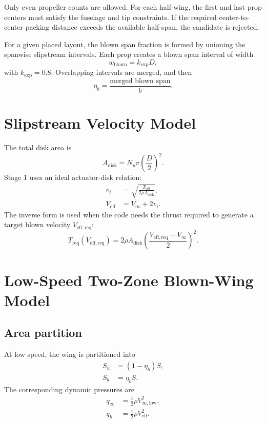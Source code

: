 \documentclass[11pt]{article}
\begin{document}
Only even propeller counts are allowed. For each half-wing, the first and last prop centers must satisfy the fuselage and tip constraints. If the required center-to-center packing distance exceeds the available half-span, the candidate is rejected.

For a given placed layout, the blown span fraction is formed by unioning the spanwise slipstream intervals. Each prop creates a blown span interval of width
\begin{equation}
w_{\mathrm{blown}} = k_{\mathrm{exp}} D,
\end{equation}
with \(k_{\mathrm{exp}} = 0.8\). Overlapping intervals are merged, and then
\begin{equation}
\eta_b = \frac{\text{merged blown span}}{b}.
\end{equation}

\section{Slipstream Velocity Model}

The total disk area is
\begin{equation}
A_{\mathrm{disk}} = N_p \pi \left(\frac{D}{2}\right)^2.
\end{equation}
Stage 1 uses an ideal actuator-disk relation:
\begin{align}
v_i &= \sqrt{\frac{T_{\mathrm{tot}}}{2 \rho A_{\mathrm{disk}}}}, \\
V_{\mathrm{eff}} &= V_\infty + 2 v_i.
\end{align}
The inverse form is used when the code needs the thrust required to generate a target blown velocity \(V_{\mathrm{eff,req}}\):
\begin{equation}
T_{\mathrm{req}}(V_{\mathrm{eff,req}})
=
2\rho A_{\mathrm{disk}}
\left(
\frac{V_{\mathrm{eff,req}} - V_\infty}{2}
\right)^2.
\end{equation}

\section{Low-Speed Two-Zone Blown-Wing Model}

\subsection{Area partition}

At low speed, the wing is partitioned into
\begin{align}
S_u &= (1-\eta_b)S, \\
S_b &= \eta_b S.
\end{align}
The corresponding dynamic pressures are
\begin{align}
q_\infty &= \frac{1}{2}\rho V_{\infty,\mathrm{low}}^2, \\
q_b &= \frac{1}{2}\rho V_{\mathrm{eff}}^2.
\end{align}
\end{document}
